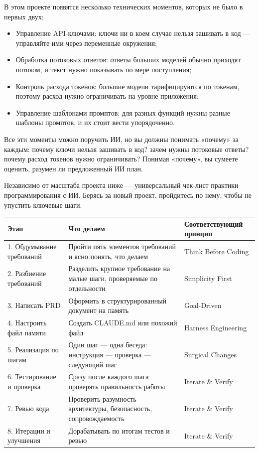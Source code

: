 В этом проекте появятся несколько технических моментов, которых не было в первых двух:

\begin{itemize}
  \item Управление API-ключами: ключи ни в коем случае нельзя зашивать в код — управляйте ими через переменные окружения;
  \item Обработка потоковых ответов: ответы больших моделей обычно приходят потоком, и текст нужно показывать по мере поступления;
  \item Контроль расхода токенов: большие модели тарифицируются по токенам, поэтому расход нужно ограничивать на уровне приложения;
  \item Управление шаблонами промптов: для разных функций нужны разные шаблоны промптов, и их стоит вести упорядоченно.
\end{itemize}

Все эти моменты можно поручить ИИ, но вы должны понимать «почему» за каждым: почему ключи нельзя зашивать в код? зачем нужны потоковые ответы? почему расход токенов нужно ограничивать? Понимая «почему», вы сумеете оценить, разумен ли предложенный ИИ план.


Независимо от масштаба проекта ниже — универсальный чек-лист практики программирования с ИИ. Берясь за новый проект, пройдитесь по нему, чтобы не упустить ключевые шаги.

\begin{center}
\begin{tabularx}{\linewidth}{|X|X|X|}
\hline
\textbf{Этап} & \textbf{Что делаем} & \textbf{Соответствующий принцип} \tabularnewline
\hline
1. Обдумывание требований & Пройти пять элементов требований и ясно понять, что делаем & Think Before Coding \tabularnewline
2. Разбиение требований & Разделить крупное требование на малые шаги, проверяемые по отдельности & Simplicity First \tabularnewline
3. Написать PRD & Оформить в структурированный документ на память & Goal-Driven \tabularnewline
4. Настроить файл памяти & Создать CLAUDE.md или похожий файл & Harness Engineering \tabularnewline
5. Реализация по шагам & Один шаг — одна беседа: инструкция — проверка — следующий шаг & Surgical Changes \tabularnewline
6. Тестирование и проверка & Сразу после каждого шага проверять правильность работы & Iterate \& Verify \tabularnewline
7. Ревью кода & Проверить разумность архитектуры, безопасность, сопровождаемость & Iterate \& Verify \tabularnewline
8. Итерации и улучшения & Дорабатывать по итогам тестов и ревью & Iterate \& Verify \tabularnewline
\hline
\end{tabularx}
\end{center}

